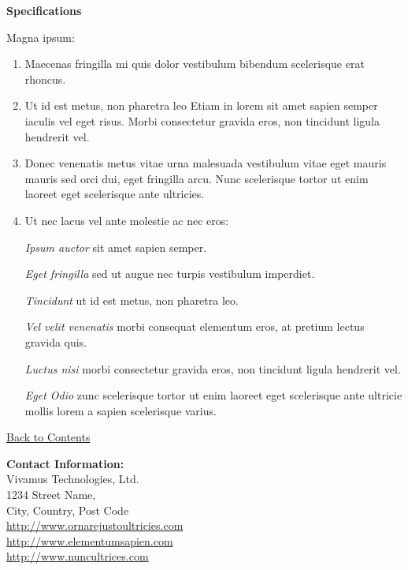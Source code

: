 \documentclass[11pt, letterpaper]{article}
\newcommand{\heading}[2]{ %
\vspace{#2} %
{\begin{center}\Large\textbf{#1}\end{center}} %
\vspace{#2} %
}
\newcommand{\BackToContents}{\hyperlink{contents}{{\small Back to Contents}}} %
\begin{document}
\begin{minipage}[t]{.30\linewidth} %


\begin{mdframed}[style=sidebar,frametitle={}] %

\heading{Specifications}{0pt}

Magna ipsum:

\begin{enumerate}
\item Maecenas fringilla mi quis dolor vestibulum bibendum scelerisque erat rhoncus.
\item Ut id est metus, non pharetra leo Etiam in lorem sit amet sapien semper iaculis vel eget risus. Morbi consectetur gravida eros, non tincidunt ligula hendrerit vel.
\item Donec venenatis metus vitae urna malesuada vestibulum vitae eget mauris mauris sed orci dui, eget fringilla arcu. Nunc scelerisque tortor ut enim laoreet eget scelerisque ante ultricies.
\item Ut nec lacus vel ante molestie ac nec eros:

\textsl{Ipsum auctor} sit amet sapien semper.

\textsl{Eget fringilla} sed ut augue nec turpis vestibulum imperdiet.

\textsl{Tincidunt} ut id est metus, non pharetra leo.

\textsl{Vel velit venenatis } morbi consequat elementum eros, at pretium lectus gravida quis.

\textsl{Luctus nisi} morbi consectetur gravida eros, non tincidunt ligula hendrerit vel.

\textsl{Eget Odio} zunc scelerisque tortor ut enim laoreet eget scelerisque ante ultricie mollis lorem a sapien scelerisque varius.
\end{enumerate}

\BackToContents %

\end{mdframed}\hfill


\centering
\begin{minipage}[t]{.95\linewidth}
\textbf{Contact Information:}\\
Vivamus Technologies, Ltd.\\
1234 Street Name,\\
City, Country, Post Code\\
\href{http://www.example.com}{http://www.ornarejustoultricies.com}\\
\href{http://www.example.com}{http://www.elementumsapien.com}\\
\href{http://www.example.com}{http://www.nuncultrices.com}
\end{minipage}


\end{minipage}
\end{document}
